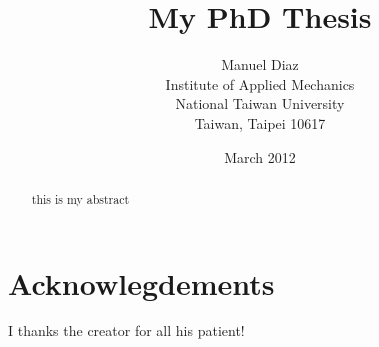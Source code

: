 \documentclass[a4paper]{report}
\begin{document}
\title{My PhD Thesis}
\author{Manuel Diaz\\[1ex]
	Institute of Applied Mechanics\\
	National Taiwan University \\
	Taiwan, Taipei 10617
	}
\date{March 2012}
\maketitle

\tableofcontents

\chapter*{Acknowlegdements}
I thanks the creator for all his patient!

\begin{abstract}
this is my abstract
\end{abstract}








\end{document}
